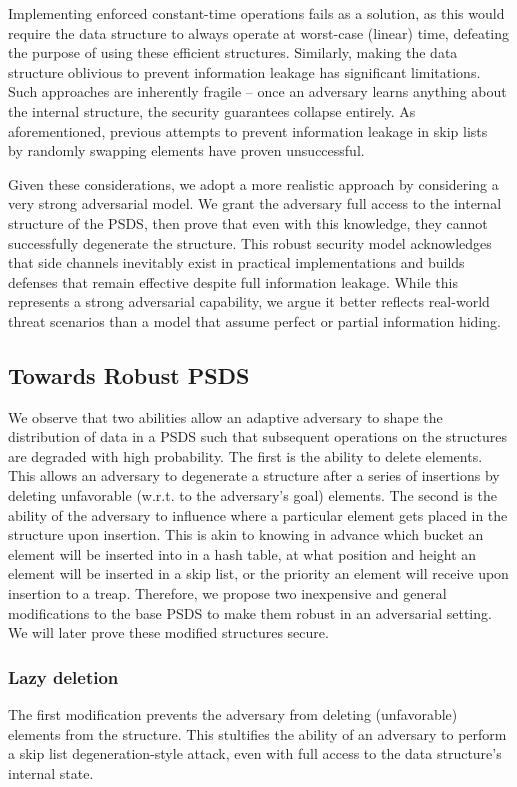 Implementing enforced constant-time operations fails as a solution, as this would require the data structure to always operate at worst-case (linear) time, defeating the purpose of using these efficient structures. Similarly, making the data structure oblivious to prevent information leakage has significant limitations. Such approaches are inherently fragile -- once an adversary learns anything about the internal structure, the security guarantees collapse entirely. As aforementioned, previous attempts to prevent information leakage in skip lists~\cite{nussbaum2019skiplist} by randomly swapping elements have proven unsuccessful.

Given these considerations, we adopt a more realistic approach by considering a very strong adversarial model. We grant the adversary full access to the internal structure of the PSDS, then prove that even with this knowledge, they cannot successfully degenerate the structure. This robust security model acknowledges that side channels inevitably exist in practical implementations and builds defenses that remain effective despite full information leakage. While this represents a strong adversarial capability, we argue it better reflects real-world threat scenarios than a model that assume perfect or partial information hiding.

\subsection{Towards Robust PSDS}

We observe that two abilities allow an adaptive adversary to shape the distribution of data in a PSDS such that subsequent operations on the structures are degraded with high probability. The first is the ability to delete elements. This allows an adversary to degenerate a structure after a series of insertions by deleting unfavorable (w.r.t. to the adversary's goal) elements. The second is the ability of the adversary to influence where a particular element gets placed in the structure upon insertion. This is akin to knowing in advance which bucket an element will be inserted into in a hash table, at what position and height an element will be inserted in a skip list, or the priority an element will receive upon insertion to a treap. Therefore, we propose two inexpensive and general modifications to the base PSDS to make them robust in an adversarial setting. We will later prove these modified structures secure. 

\subsubsection{Lazy deletion} The first modification prevents the adversary from deleting (unfavorable) elements from the structure. This stultifies the ability of an adversary to perform a skip list degeneration-style attack, even with full access to the data structure's internal state. 

